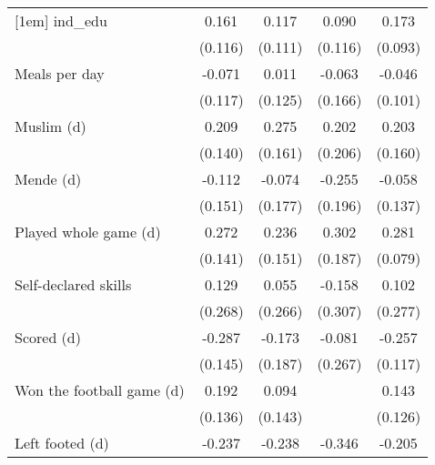 {\begin{tabular}{l*{4}{c}}
[1em]
ind\_edu             &       0.161         &       0.117         &       0.090         &       0.173\sym{*}  \\
                    &     (0.116)         &     (0.111)         &     (0.116)         &     (0.093)         \\
[1em]
Meals per day       &      -0.071         &       0.011         &      -0.063         &      -0.046         \\
                    &     (0.117)         &     (0.125)         &     (0.166)         &     (0.101)         \\
[1em]
Muslim (d)          &       0.209         &       0.275\sym{*}  &       0.202         &       0.203         \\
                    &     (0.140)         &     (0.161)         &     (0.206)         &     (0.160)         \\
[1em]
Mende (d)           &      -0.112         &      -0.074         &      -0.255         &      -0.058         \\
                    &     (0.151)         &     (0.177)         &     (0.196)         &     (0.137)         \\
[1em]
Played whole game (d)&       0.272\sym{*}  &       0.236         &       0.302         &       0.281\sym{***}\\
                    &     (0.141)         &     (0.151)         &     (0.187)         &     (0.079)         \\
[1em]
Self-declared skills&       0.129         &       0.055         &      -0.158         &       0.102         \\
                    &     (0.268)         &     (0.266)         &     (0.307)         &     (0.277)         \\
[1em]
Scored (d)          &      -0.287\sym{**} &      -0.173         &      -0.081         &      -0.257\sym{**} \\
                    &     (0.145)         &     (0.187)         &     (0.267)         &     (0.117)         \\
[1em]
Won the football game (d)&       0.192         &       0.094         &                     &       0.143         \\
                    &     (0.136)         &     (0.143)         &                     &     (0.126)         \\
[1em]
Left footed (d)     &      -0.237\sym{*}  &      -0.238\sym{*}  &      -0.346\sym{**} &      -0.205\sym{**} \\

\end{tabular}}
